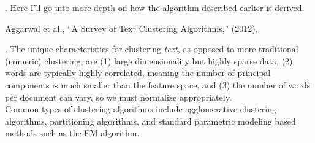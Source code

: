 \documentclass[11pt]{article}
\newcommand\myspace[1][]{\vspace{#1\bigskipamount}}
\newcommand\p{\Needspace{10\baselineskip} \noindent}
\begin{document}
\myspace
\p {}. Here I'll go into more depth on how the algorithm described earlier is derived. 



\begin{comment}
\p \blue{Overview}. Full title: ``Recursive Deep Models for Semantic Compositionality Over a Sentiment Treebank,'' by Socher et al., 2014. Authors introduce the \href{https://nlp.stanford.edu/sentiment/treebank.html}{Sentiment Treebank}, a dataset containing sentiment labels for 215,154 phrases in the parse trees of 11,855 sentences. They also introduce a model called the \green{Recursive Neural Tensor Network}. \red{TODO} Finish note on this  . . . 
\end{comment}


\vspace{-1em}
{\footnotesize Aggarwal et al., ``A Survey of Text Clustering Algorithms,'' (2012).}

\p {}. The unique characteristics for clustering \textit{text}, as opposed to more traditional (numeric) clustering, are (1) large dimensionality but highly sparse data, (2) words are typically highly correlated, meaning the number of principal components is much smaller than the feature space, and (3) the number of words per document can vary, so we must normalize appropriately.\\

\p Common types of clustering algorithms include agglomerative clustering algorithms, partitioning algorithms, and standard parametric modeling based methods such as the EM-algorithm.
\end{document}
